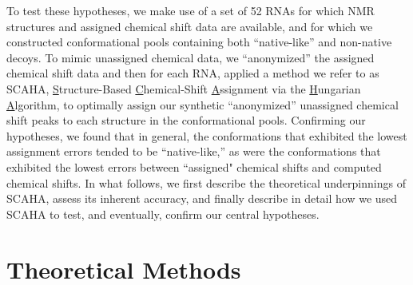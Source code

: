 \documentclass[journal=jcisd8,manuscript=article,layout=onecolumn]{achemso}
\begin{document}
To test these hypotheses, we make use of a set of 52 RNAs for which NMR structures and assigned chemical shift data are available, and for which we constructed conformational pools containing both ``native-like'' and non-native decoys. To mimic unassigned chemical data, we ``anonymized'' the assigned chemical shift data and then for each RNA, applied a method we refer to as SCAHA,  \underline{S}tructure-Based \underline{C}hemical-Shift \underline{A}ssignment via the \underline{H}ungarian \underline{A}lgorithm, to optimally assign our synthetic ``anonymized'' unassigned chemical shift peaks to each structure in the conformational pools. Confirming our hypotheses, we found that in general,  the conformations that exhibited the lowest assignment errors tended to be ``native-like,'' as were the conformations that exhibited the lowest errors between ``assigned" chemical shifts and computed chemical shifts. In what follows, we first describe the theoretical underpinnings of SCAHA, assess its inherent accuracy,  and finally describe in detail how we used SCAHA to test, and eventually, confirm our central hypotheses.

\section{Theoretical Methods}
\end{document}
